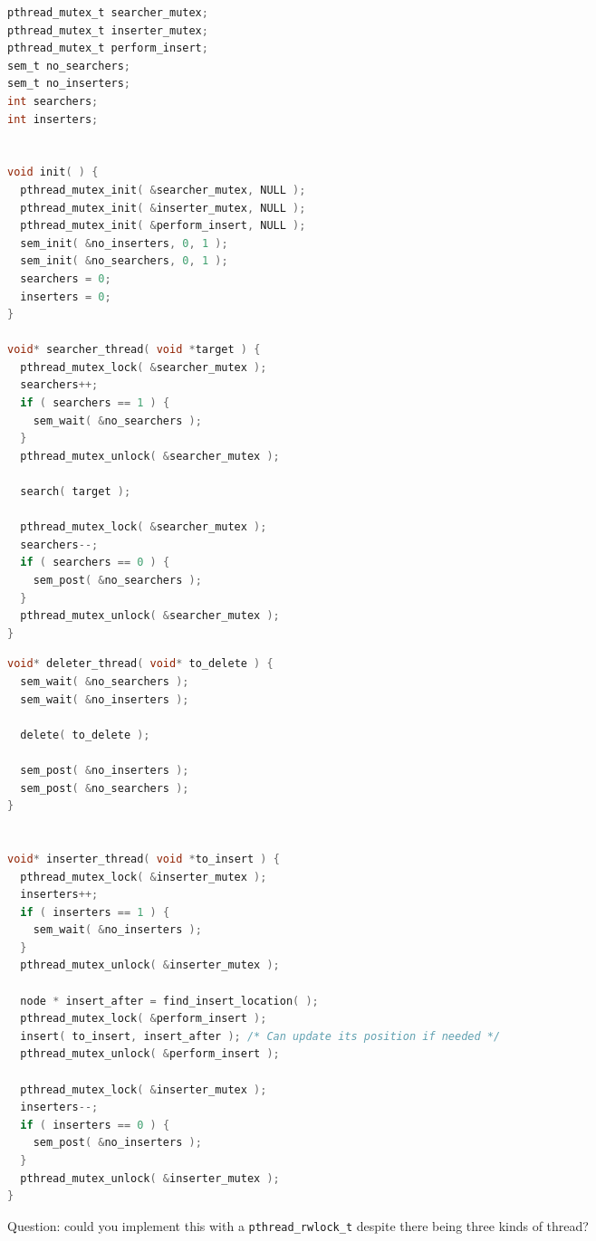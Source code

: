 	{\scriptsize
		\begin{multicols}{2}

			\begin{lstlisting}[language=C]
pthread_mutex_t searcher_mutex;
pthread_mutex_t inserter_mutex;
pthread_mutex_t perform_insert;
sem_t no_searchers;
sem_t no_inserters;
int searchers;
int inserters;


void init( ) {
  pthread_mutex_init( &searcher_mutex, NULL );
  pthread_mutex_init( &inserter_mutex, NULL );
  pthread_mutex_init( &perform_insert, NULL );
  sem_init( &no_inserters, 0, 1 );
  sem_init( &no_searchers, 0, 1 );
  searchers = 0;
  inserters = 0;
}

void* searcher_thread( void *target ) {
  pthread_mutex_lock( &searcher_mutex );
  searchers++;
  if ( searchers == 1 ) {
    sem_wait( &no_searchers );
  }
  pthread_mutex_unlock( &searcher_mutex );
  
  search( target );
  
  pthread_mutex_lock( &searcher_mutex );
  searchers--;
  if ( searchers == 0 ) {
    sem_post( &no_searchers );
  }
  pthread_mutex_unlock( &searcher_mutex );
}
\end{lstlisting}
			\columnbreak
			\begin{lstlisting}[language=C]
void* deleter_thread( void* to_delete ) {
  sem_wait( &no_searchers );
  sem_wait( &no_inserters );
  
  delete( to_delete );
  
  sem_post( &no_inserters );
  sem_post( &no_searchers );
}


void* inserter_thread( void *to_insert ) {
  pthread_mutex_lock( &inserter_mutex );
  inserters++;
  if ( inserters == 1 ) {
    sem_wait( &no_inserters );
  }
  pthread_mutex_unlock( &inserter_mutex );
  
  node * insert_after = find_insert_location( );
  pthread_mutex_lock( &perform_insert );
  insert( to_insert, insert_after ); /* Can update its position if needed */
  pthread_mutex_unlock( &perform_insert );
  
  pthread_mutex_lock( &inserter_mutex );
  inserters--;
  if ( inserters == 0 ) {
    sem_post( &no_inserters );
  }
  pthread_mutex_unlock( &inserter_mutex );
}
\end{lstlisting}
		\end{multicols}
	}

Question: could you implement this with a \texttt{pthread\_rwlock\_t} despite there being three kinds of thread?




